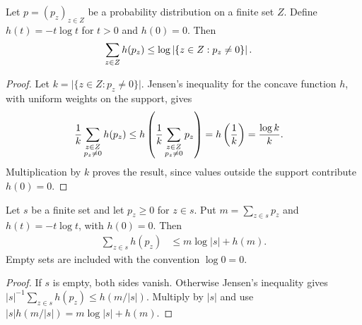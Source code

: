 \begin{lemma}
    \label{lem:probability_entropy_le_log_card_support}
    \leanok
    Let $p=(p_z)_{z\in Z}$ be a probability distribution on a finite set $Z$.
    Define $h(t)=-t\log t$ for $t>0$ and $h(0)=0$. Then
    \begin{align}
        \sum_{z\in Z}h(p_z)
         & \leq
        \log\left\lvert\{z\in Z:p_z\neq0\}\right\rvert.
        \notag
    \end{align}
\end{lemma}
\begin{proof}\leanok
    Let $k=\lvert\{z\in Z:p_z\neq0\}\rvert$. Jensen's inequality for the
    concave function $h$, with uniform weights on the support, gives
    \begin{align}
        \frac{1}{k}\sum_{\substack{z\in Z \\p_z\neq0}}h(p_z)
         & \leq
        h\left(\frac{1}{k}
        \sum_{\substack{z\in Z            \\p_z\neq0}}p_z\right)
        =h\left(\frac{1}{k}\right)
        =\frac{\log k}{k}.
        \notag
    \end{align}
    Multiplication by $k$ proves the result, since values outside the support
    contribute $h(0)=0$.
\end{proof}

\begin{theorem}
    \label{thm:entropy_mass_card}
    \leanok
    Let $s$ be a finite set and let $p_z\ge0$ for $z\in s$.
    Put $m=\sum_{z\in s}p_z$ and $h(t)=-t\log t$, with $h(0)=0$.
    Then
    \begin{align}
        \label{eq:entropy_mass_card}
        \sum_{z\in s}h(p_z) & \le m\log|s|+h(m).
    \end{align}
    Empty sets are included with the convention $\log0=0$.
\end{theorem}
\begin{proof}\leanok
    If $s$ is empty, both sides vanish. Otherwise Jensen's inequality gives
    $|s|^{-1}\sum_{z\in s}h(p_z)\le h(m/|s|)$.
    Multiply by $|s|$ and use $|s|h(m/|s|)=m\log|s|+h(m)$.
\end{proof}


